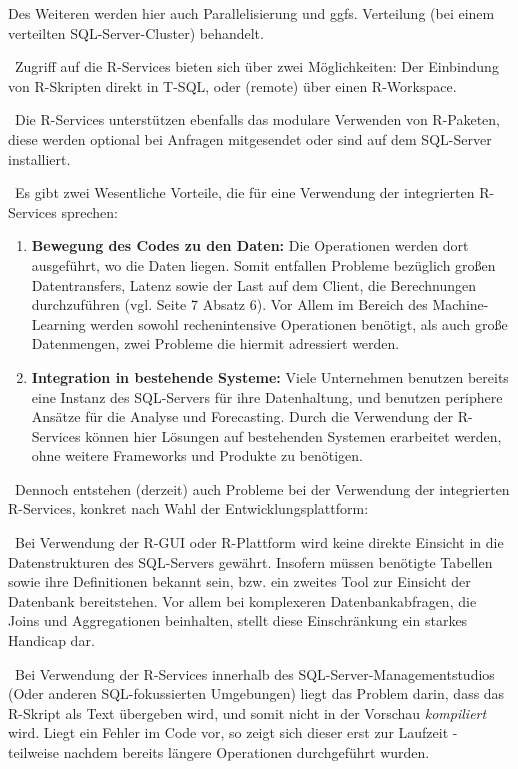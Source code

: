 Des Weiteren werden hier auch Parallelisierung und ggfs. Verteilung (bei einem verteilten SQL-Server-Cluster) behandelt.

~\newline Zugriff auf die R-Services bieten sich über zwei Möglichkeiten: Der Einbindung von R-Skripten direkt in T-SQL, oder (remote) über einen R-Workspace. 

~\newline Die R-Services unterstützen ebenfalls das modulare Verwenden von R-Paketen, diese werden optional bei Anfragen mitgesendet oder sind auf dem SQL-Server installiert. 

~\newline Es gibt zwei Wesentliche Vorteile, die für eine Verwendung der integrierten R-Services sprechen:

\begin{enumerate}
	\item \textbf{Bewegung des Codes zu den Daten:} Die Operationen werden dort ausgeführt, wo die Daten liegen. Somit entfallen Probleme bezüglich großen Datentransfers, Latenz sowie der Last auf dem Client, die Berechnungen durchzuführen (vgl. \cite{SQLData} Seite 7 Absatz 6). Vor Allem im Bereich des Machine-Learning werden sowohl rechenintensive Operationen benötigt, als auch große Datenmengen, zwei Probleme die hiermit adressiert werden. 
	\item \textbf{Integration in bestehende Systeme:} Viele Unternehmen benutzen bereits eine Instanz des SQL-Servers für ihre Datenhaltung, und benutzen periphere Ansätze für die Analyse und Forecasting. Durch die Verwendung der R-Services können hier Lösungen auf bestehenden Systemen erarbeitet werden, ohne weitere Frameworks und Produkte zu benötigen. 
\end{enumerate}

~\newline Dennoch entstehen (derzeit) auch Probleme bei der Verwendung der integrierten R-Services, konkret nach Wahl der Entwicklungsplattform: 

~\newline Bei Verwendung der R-GUI oder R-Plattform wird keine direkte Einsicht in die Datenstrukturen des SQL-Servers gewährt. Insofern müssen benötigte Tabellen sowie ihre Definitionen bekannt sein, bzw. ein zweites Tool zur Einsicht der Datenbank bereitstehen. Vor allem bei komplexeren Datenbankabfragen, die Joins und Aggregationen beinhalten, stellt diese Einschränkung ein starkes Handicap dar. 

~\newline Bei Verwendung der R-Services innerhalb des SQL-Server-Managementstudios (Oder anderen SQL-fokussierten Umgebungen) liegt das Problem darin, dass das R-Skript als Text übergeben wird, und somit nicht in der Vorschau \textit{kompiliert} wird. Liegt ein Fehler im Code vor, so zeigt sich dieser erst zur Laufzeit - teilweise nachdem bereits längere Operationen durchgeführt wurden. 

